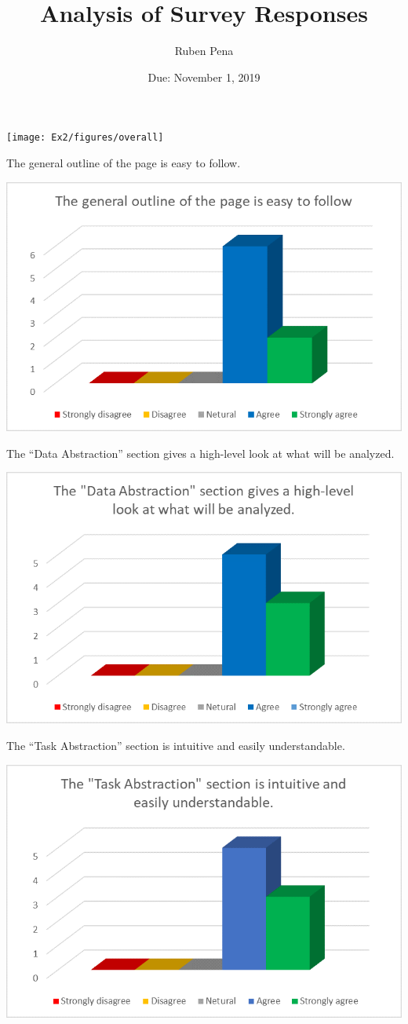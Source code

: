 \documentclass[]{article}
\title{Analysis of Survey Responses}
\author{Ruben Pena}
\date{Due: November 1, 2019}
\begin{document}
\maketitle

\begin{center}\texttt{[image: Ex2/figures/overall]} \end{center}

The general outline of the page is easy to follow.

\begin{center}\includegraphics[width=0.8\linewidth]{Ex2/figures/q1} \end{center}

The ``Data Abstraction'' section gives a high-level look at what will be
analyzed.\\

\begin{center}\includegraphics[width=0.8\linewidth]{Ex2/figures/q2} \end{center}

The ``Task Abstraction'' section is intuitive and easily understandable.

\begin{center}\includegraphics[width=0.8\linewidth]{Ex2/figures/q3} \end{center}
\end{document}
